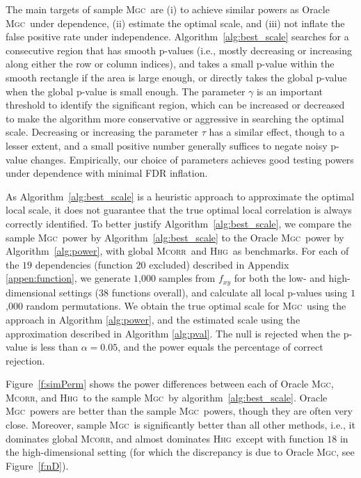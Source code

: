 \documentclass[11pt]{article}
\providecommand{\sct}[1]{{\normalfont\textsc{#1}}}
\newcommand{\Mgc}{\sct{Mgc}}
\newcommand{\Hhg}{\sct{Hhg}}
\newcommand{\Mcorr}{\sct{Mcorr}}
\begin{document}
The main targets of sample \Mgc~are (i) to achieve similar powers as Oracle \Mgc~under dependence, (ii) estimate the optimal scale, and (iii) not inflate the false positive rate under independence. Algorithm~\ref{alg:best_scale} searches for a consecutive region that has smooth p-values (i.e., mostly decreasing or increasing along either the row or column indices), and takes a small p-value within the smooth rectangle if the area is large enough, or directly takes the global p-value when the global p-value is small enough. The parameter $\gamma$ is an important threshold to identify the significant region, which can be increased or decreased to make the algorithm more conservative or aggressive in searching the optimal scale. Decreasing or increasing the parameter $\tau$ has a similar effect, though to a lesser extent, and a small positive number generally suffices to negate noisy p-value changes. Empirically, our choice of parameters achieves good testing powers under dependence with minimal FDR inflation.

As Algorithm~\ref{alg:best_scale} is a heuristic approach to approximate the optimal local scale, it does not guarantee that the true optimal local correlation is always correctly identified. To better justify Algorithm~\ref{alg:best_scale}, we compare the sample \Mgc~power by Algorithm~\ref{alg:best_scale} to the Oracle \Mgc~power by Algorithm~\ref{alg:power}, with  global \Mcorr~and \Hhg~as benchmarks. For each of the $19$ dependencies (function $20$ excluded) described in Appendix \ref{appen:function}, we generate $1$,$000$ samples from $f_{xy}$ for both the low- and high-dimensional settings ($38$ functions overall), and calculate all local p-values using $1$,$000$ random permutations. 
We obtain the true optimal scale for \Mgc~using the approach in Algorithm \ref{alg:power}, and the estimated scale using the approximation described in Algorithm \ref{alg:pval}.  
The null is rejected when the p-value is less than $\alpha=0.05$, and the power equals the percentage of correct rejection. 

Figure~\ref{f:simPerm} shows the power differences between each of Oracle \Mgc, \Mcorr, and \Hhg~to the sample \Mgc~by algorithm~\ref{alg:best_scale}. Oracle \Mgc~powers are better than the sample \Mgc~powers, though they are often very close. Moreover, sample \Mgc~is significantly better than all other methods, i.e., it dominates global \Mcorr, and almost dominates \Hhg~except with function $18$ in the high-dimensional setting (for which the discrepancy is due to Oracle \Mgc, see Figure~\ref{f:nD}). 
\end{document}
